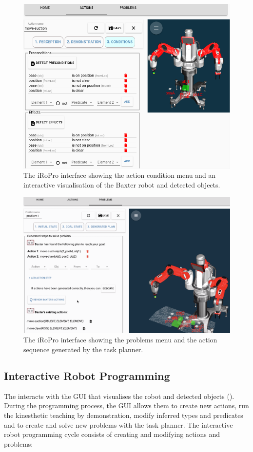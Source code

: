 \begin{figure}
	\includegraphics[width=\linewidth]{Fig8.png}
	\caption{The iRoPro interface showing the action condition menu and an interactive visualisation of the Baxter robot and detected objects.}\label{fig:gui-action-3}%
\end{figure}

\begin{figure}
	\includegraphics[width=\linewidth]{Fig9.png}
	\caption{The iRoPro interface showing the problems menu and the action sequence generated by the task planner.}\label{fig:gui-problem}%
\end{figure}

\subsection{Interactive Robot Programming}
\label{sec:interactive}
The interacts with the GUI that visualises the robot and detected objects ().
During the programming process, the GUI allows them to create new actions, run the kinesthetic teaching by demonstration, modify inferred types and predicates and to create and solve new problems with the task planner.
The interactive robot programming cycle consists of creating and modifying actions and problems:
